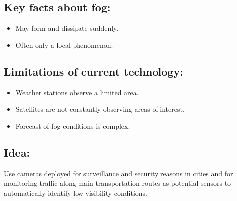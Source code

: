\documentclass{article}
\begin{document}
\subsection*{Key facts about fog:}
\begin{itemize}
  \item May form and dissipate suddenly.
  \item Often only a local phenomenon.
\end{itemize}

\subsection*{Limitations of current technology:}
\begin{itemize}
\item Weather stations observe a limited area.
\item Satellites are not constantly observing areas of interest.
\item Forecast of fog conditions is complex.
\end{itemize}

\subsection*{Idea:}
Use cameras deployed for surveillance and security reasons in cities and for monitoring traffic along
main transportation routes as potential sensors to
automatically identify low visibility conditions.
\end{document}
